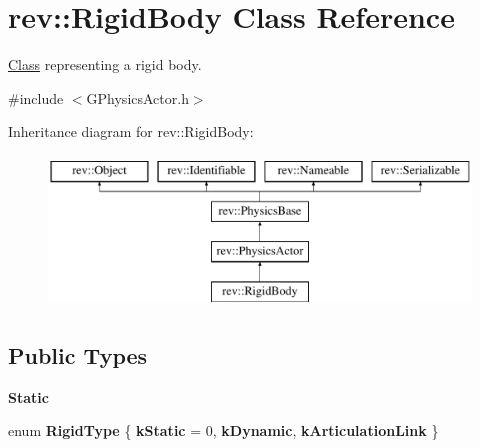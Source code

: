 \hypertarget{classrev_1_1_rigid_body}{}\section{rev\+::Rigid\+Body Class Reference}
\label{classrev_1_1_rigid_body}


\mbox{\hyperlink{struct_class}{Class}} representing a rigid body.  




{\ttfamily \#include $<$G\+Physics\+Actor.\+h$>$}

Inheritance diagram for rev\+::Rigid\+Body\+:\begin{figure}[H]
\begin{center}
\leavevmode
\includegraphics[height=4.000000cm]{classrev_1_1_rigid_body}
\end{center}
\end{figure}
\subsection*{Public Types}
\begin{Indent}\textbf{ Static}\par
\begin{DoxyCompactItemize}
\item 
\mbox{\label{classrev_1_1_rigid_body_a5d4a76bfadaa015d8e4830f19496dc48}} 
enum {\bfseries Rigid\+Type} \{ {\bfseries k\+Static} = 0, 
{\bfseries k\+Dynamic}, 
{\bfseries k\+Articulation\+Link}
 \}
\end{DoxyCompactItemize}
\end{Indent}
